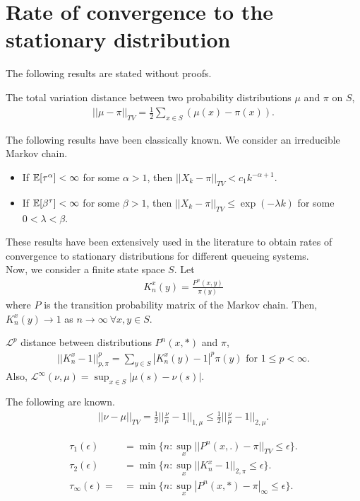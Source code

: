 \documentclass[all-lectures.tex]{subfiles}
\begin{document}
\section{Rate of convergence to the stationary distribution}
The following results are stated without proofs.
\begin{defn}
The total variation distance between two probability distributions $\mu$ and $\pi$ on $S$, 
\begin{align*}
||\mu - \pi||_{TV} = \frac{1}{2} \sum_{x\in S} (\mu(x) - \pi(x)).
\end{align*}
\end{defn}
The following results have been classically known.  We consider an irreducible Markov chain.
\begin{itemize}
\item If $\mathbb{E}[\tau^\alpha] < \infty$ for some $\alpha > 1$, then $|| X_k - \pi ||_{TV} < c_1 k^{-\alpha +1}$.
\item If $\mathbb{E}[\beta^{\tau}] < \infty$ for some $\beta > 1$, then $|| X_k - \pi||_{TV} \leq \exp(-\lambda k)$ for some $0 < \lambda < \beta$.
\end{itemize}
These results have been extensively used in the literature to obtain rates of convergence to stationary distributions for different queueing systems. \\
\indent Now, we consider a finite state space $S$. Let 
\begin{align*}
K_n^{x}(y) = \frac{P^n(x,y)}{\pi(y)}
\end{align*}
where $P$ is the transition probability matrix of the Markov chain. Then, $K_n^{x}(y) \rightarrow 1$ as $n \rightarrow \infty \ \forall x,y \in S$. 
\begin{defn}
$\mathcal{L}^p$ distance between distributions $P^n(x,*)$ and $\pi$, 
\begin{align*}
||K^x_n - 1||^p_{p,\pi} = \sum_{y\in S} |K^x_n(y)-1|^p \pi(y) \text{ for } 1 \leq p < \infty.
\end{align*}
Also, $\mathcal{L}^{\infty}(\nu,\mu) = \sup_{x\in S} |\mu(s) - \nu(s)|$.
\end{defn}

The following are known.
\begin{align}\label{eq:tau_bounds}
||\nu -\mu||_{TV} = \frac{1}{2} ||\frac{\nu}{\mu} -1||_{1,\mu} \leq \frac{1}{2} ||\frac{\nu}{\mu} -1 ||_{2,\mu}.
\end{align}
\begin{defn}
\begin{align*}
\tau_1(\epsilon) &= \min\{n: \sup_x ||P^n(x,.)-\pi||_{TV} \leq \epsilon\}. \\
\tau_2(\epsilon) &= \min\{n: \sup_x ||K_n^x - 1||_{2,\pi} \leq \epsilon\}. \\
\tau_\infty(\epsilon) = &= \min\{n: \sup _x |P^n(x,*) - \pi|_\infty \leq \epsilon\}.
\end{align*}
\end{defn}
\end{document}
